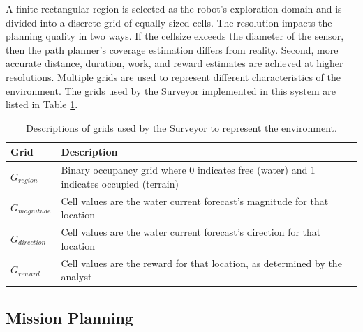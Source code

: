 \documentclass{tamuccthesis}
\begin{document}
A finite rectangular region is selected as the robot's exploration domain and is divided into a discrete grid of equally sized cells. The resolution impacts the planning quality in two ways. If the cellsize exceeds the diameter of the sensor, then the path planner's coverage estimation differs from reality. Second, more accurate distance, duration, work, and reward estimates are achieved at higher resolutions. Multiple grids are used to represent different characteristics of the environment. The grids used by the Surveyor implemented in this system are listed in Table \ref{tbl:grids}. 

\begin{table}[H]\small
\begin{tabular}{|l|l|}
\hline
Grid          & Description \\
\hline
$G_{region}$    & Binary occupancy grid where 0 indicates free (water) and 1 indicates occupied (terrain) \\
\hline
$G_{magnitude}$ & Cell values are the water current forecast's magnitude for that location \\
\hline
$G_{direction}$ & Cell values are the water current forecast's direction for that location \\
\hline
$G_{reward}$    & Cell values are the reward for that location, as determined by the analyst \\                           
\hline
\end{tabular}
\caption{Descriptions of grids used by the Surveyor to represent the environment.}
\label{tbl:grids}
\end{table}

\subsection{Mission Planning}
\end{document}
